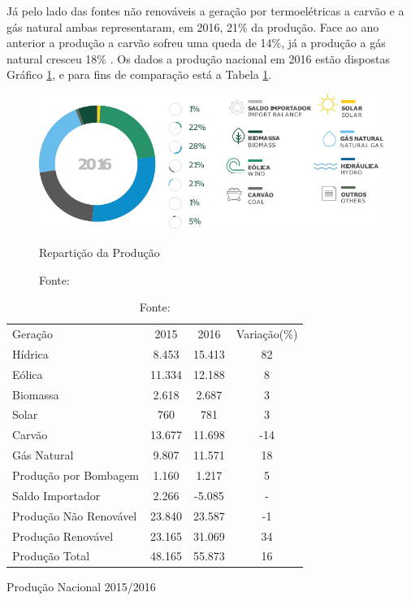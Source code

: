 Já pelo lado das fontes não renováveis a geração por termoelétricas a carvão e a gás natural ambas representaram, em 2016, 21\% da produção. Face ao ano anterior a produção a carvão sofreu uma queda de 14\%, já a produção a gás natural cresceu 18\% \cite[p.~8]{REN}. Os dados a produção nacional em 2016 estão dispostas Gráfico \ref{fig:ReparticaoDaProducao}, e para fins de comparação está a Tabela \ref{tab:producao20152016}.

\begin{figure}[H]
	\centering
	\captionsetup{width=0.7\textwidth, font=footnotesize, textfont=bf}
	\includegraphics[width=0.7\linewidth]{img/ReparticaoDaProducao2016.pdf}
	\caption{Repartição da Produção}
	\vspace{-3.5mm}
	\caption*{Fonte: }
	\label{fig:ReparticaoDaProducao}
\end{figure}

\begin{table}[H]
	\centering
	\captionsetup{width=0.74\textwidth, font=footnotesize, textfont=bf}
    \begin{tabular}{|l|c|c|c|}
    \rowcolor[HTML]{000000}
    {\color[HTML]{FFFFFF} Geração} & {\color[HTML]{FFFFFF} 2015} & {\color[HTML]{FFFFFF} 2016}   & {\color[HTML]{FFFFFF} Variação(\%) }  \\
    Hídrica                 & 8.453  & 15.413 & 82           \\
    Eólica                  & 11.334 & 12.188 & 8            \\
    Biomassa                & 2.618  & 2.687  & 3            \\
    Solar                   & 760    &  781   & 3            \\
    Carvão                  & 13.677 & 11.698 & -14          \\
    Gás Natural             & 9.807  & 11.571 & 18           \\
    Produção por Bombagem   & 1.160  & 1.217  & 5            \\
    Saldo Importador        & 2.266  & -5.085 & -            \\ \hline
    Produção Não Renovável  & 23.840 & 23.587 & -1           \\ \hline
    Produção Renovável      & 23.165 & 31.069 & 34           \\ \hline
    Produção Total          & 48.165 & 55.873 & 16           \\ \hline
    \end{tabular}
    \caption{Produção Nacional 2015/2016}
    \vspace{-3.5mm}
	\caption*{Fonte: }
    \label{tab:producao20152016}
\end{table}
